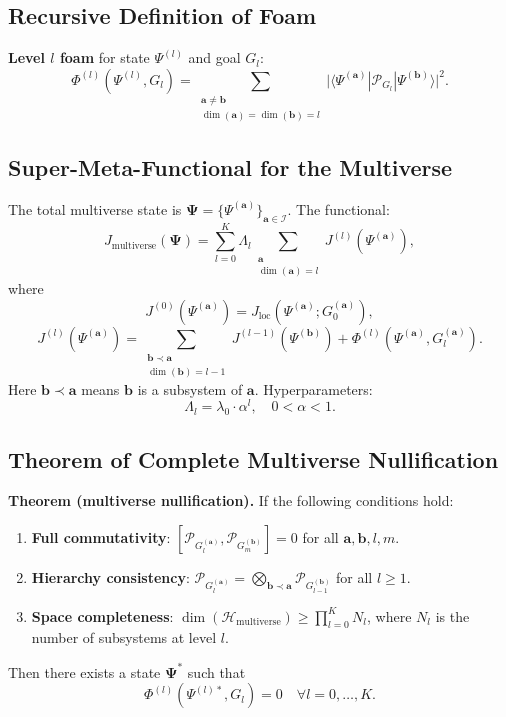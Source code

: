 \documentclass[12pt,a4paper]{article}
\begin{document}
\subsection{Recursive Definition of Foam}

\textbf{Level \(l\) foam} for state \(\Psi^{(l)}\) and goal \(G_l\):
\[
\Phi^{(l)}(\Psi^{(l)}, G_l) = \sum_{\substack{\mathbf{a}\neq\mathbf{b}\\ \dim(\mathbf{a})=\dim(\mathbf{b})=l}} \bigl| \langle \Psi^{(\mathbf{a})} | \mathcal{P}_{G_l} | \Psi^{(\mathbf{b})} \rangle \bigr|^2.
\]

\subsection{Super-Meta-Functional for the Multiverse}

The total multiverse state is \(\mathbf{\Psi} = \{\Psi^{(\mathbf{a})}\}_{\mathbf{a}\in\mathcal{I}}\). The functional:
\[
J_{\text{multiverse}}(\mathbf{\Psi}) = \sum_{l=0}^K \Lambda_l \sum_{\substack{\mathbf{a} \\ \dim(\mathbf{a})=l}} J^{(l)}(\Psi^{(\mathbf{a})}),
\]
where
\[
J^{(0)}(\Psi^{(\mathbf{a})}) = J_{\text{loc}}(\Psi^{(\mathbf{a})}; G_0^{(\mathbf{a})}),
\]
\[
J^{(l)}(\Psi^{(\mathbf{a})}) = \sum_{\substack{\mathbf{b}\prec\mathbf{a}\\ \dim(\mathbf{b})=l-1}} J^{(l-1)}(\Psi^{(\mathbf{b})}) + \Phi^{(l)}(\Psi^{(\mathbf{a})}, G_l^{(\mathbf{a})}).
\]
Here \(\mathbf{b}\prec\mathbf{a}\) means \(\mathbf{b}\) is a subsystem of \(\mathbf{a}\). Hyperparameters:
\[
\Lambda_l = \lambda_0 \cdot \alpha^l, \quad 0<\alpha<1.
\]

\subsection{Theorem of Complete Multiverse Nullification}

\textbf{Theorem (multiverse nullification).} If the following conditions hold:
\begin{enumerate}
    \item \textbf{Full commutativity}: \([\mathcal{P}_{G_l^{(\mathbf{a})}}, \mathcal{P}_{G_m^{(\mathbf{b})}}] = 0\) for all \(\mathbf{a},\mathbf{b},l,m\).
    \item \textbf{Hierarchy consistency}: \(\mathcal{P}_{G_l^{(\mathbf{a})}} = \bigotimes_{\mathbf{b}\prec\mathbf{a}} \mathcal{P}_{G_{l-1}^{(\mathbf{b})}}\) for all \(l\ge 1\).
    \item \textbf{Space completeness}: \(\dim(\mathcal{H}_{\text{multiverse}}) \ge \prod_{l=0}^K N_l\), where \(N_l\) is the number of subsystems at level \(l\).
\end{enumerate}
Then there exists a state \(\mathbf{\Psi}^*\) such that
\[
\Phi^{(l)}(\Psi^{(l)*}, G_l) = 0 \quad \forall l = 0,\dots,K.
\]
\end{document}
